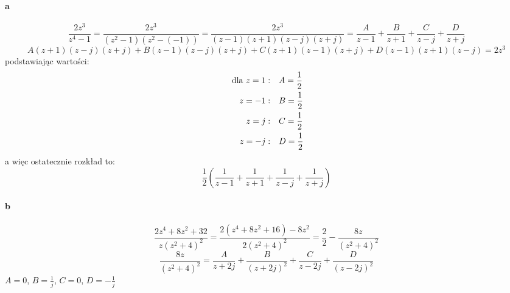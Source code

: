 \documentclass[a4paper,fleqn]{article}
\begin{document}
	\paragraph{a}
	\[ \frac{ 2z^3 }{ z^4-1 } = \frac{ 2z^3 }{ (z^2-1)(z^2-(-1)) } =
		\frac{ 2z^3 }{ (z-1)(z+1)(z-j)(z+j) } =
		\frac{A}{z-1} + \frac{B}{z+1} + \frac{C}{z-j} + \frac{D}{z+j} \]
	\[ A(z+1)(z-j)(z+j) + B(z-1)(z-j)(z+j) + C(z+1)(z-1)(z+j) + D(z-1)(z+1)(z-j)
		= 2z^3 \]
	podstawiając wartości:
	\begin{align*}
		\text{ dla } z = 1:& \quad A = \frac 1 2 \\
		z = -1:& \quad B = \frac 1 2 \\
		z = j:& \quad C = \frac 1 2 \\
		z = -j:& \quad D = \frac 1 2
	\end{align*}
	a więc ostatecznie rozkład to:
	\[ \frac 1 2 \left(
		\frac{1}{z-1} + \frac{1}{z+1} + \frac{1}{z-j} + \frac{1}{z+j} \right) \]

	\paragraph{b}
	\[ \frac{ 2z^4 + 8z^2 + 32 }{ z(z^2 + 4)^2 } =
		\frac{ 2(z^4 + 8z^2 + 16) - 8z^2 }{ 2(z^2 + 4)^2 } =
		\frac 2 2 - \frac{8z}{(z^2+4)^2} \]
	\[ \frac{8z}{(z^2+4)^2} = \frac{A}{z+2j} + \frac{B}{(z+2j)^2} +
		\frac{C}{z-2j} + \frac{D}{(z-2j)^2} \]
	$A = 0$, $B=\frac 1 j$, $C = 0$, $D = - \frac 1 j$
\end{document}
